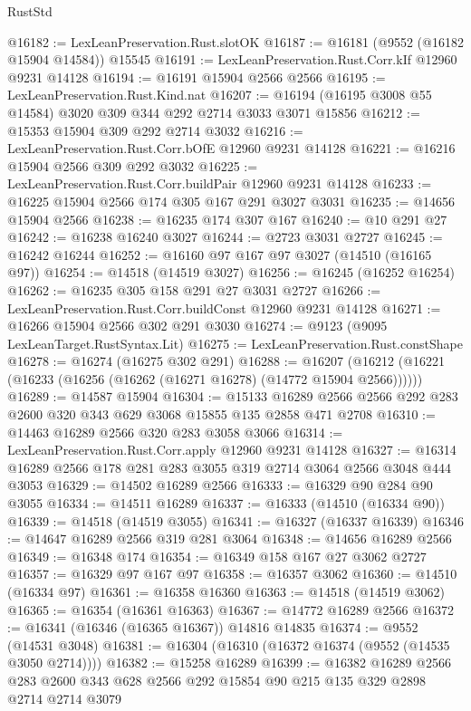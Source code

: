 \begin{lexlean}{RustStd}
\begin{coremodule}
@16182 := LexLeanPreservation.Rust.slotOK
@16187 := @16181 (@9552 (@16182 @15904 @14584)) @15545
@16191 := LexLeanPreservation.Rust.Corr.kIf @12960 @9231 @14128
@16194 := @16191 @15904 @2566 @2566
@16195 := LexLeanPreservation.Rust.Kind.nat
@16207 := @16194 (@16195 @3008 @55 @14584) @3020 @309 @344 @292 @2714 @3033 @3071 @15856
@16212 := @15353 @15904 @309 @292 @2714 @3032
@16216 := LexLeanPreservation.Rust.Corr.bOfE @12960 @9231 @14128
@16221 := @16216 @15904 @2566 @309 @292 @3032
@16225 := LexLeanPreservation.Rust.Corr.buildPair @12960 @9231 @14128
@16233 := @16225 @15904 @2566 @174 @305 @167 @291 @3027 @3031
@16235 := @14656 @15904 @2566
@16238 := @16235 @174 @307 @167
@16240 := @10 @291 @27
@16242 := @16238 @16240 @3027
@16244 := @2723 @3031 @2727
@16245 := @16242 @16244
@16252 := @16160 @97 @167 @97 @3027 (@14510 (@16165 @97))
@16254 := @14518 (@14519 @3027)
@16256 := @16245 (@16252 @16254)
@16262 := @16235 @305 @158 @291 @27 @3031 @2727
@16266 := LexLeanPreservation.Rust.Corr.buildConst @12960 @9231 @14128
@16271 := @16266 @15904 @2566 @302 @291 @3030
@16274 := @9123 (@9095 LexLeanTarget.RustSyntax.Lit)
@16275 := LexLeanPreservation.Rust.constShape
@16278 := @16274 (@16275 @302 @291)
@16288 := @16207 (@16212 (@16221 (@16233 (@16256 (@16262 (@16271 @16278) (@14772 @15904 @2566))))))
@16289 := @14587 @15904
@16304 := @15133
    @16289
    @2566
    @2566
    @292
    @283
    @2600
    @320
    @343
    @629
    @3068
    @15855
    @135
    @2858
    @471
    @2708
@16310 := @14463 @16289 @2566 @320 @283 @3058 @3066
@16314 := LexLeanPreservation.Rust.Corr.apply @12960 @9231 @14128
@16327 := @16314 @16289 @2566 @178 @281 @283 @3055 @319 @2714 @3064 @2566 @3048 @444 @3053
@16329 := @14502 @16289 @2566
@16333 := @16329 @90 @284 @90 @3055
@16334 := @14511 @16289
@16337 := @16333 (@14510 (@16334 @90))
@16339 := @14518 (@14519 @3055)
@16341 := @16327 (@16337 @16339)
@16346 := @14647 @16289 @2566 @319 @281 @3064
@16348 := @14656 @16289 @2566
@16349 := @16348 @174
@16354 := @16349 @158 @167 @27 @3062 @2727
@16357 := @16329 @97 @167 @97
@16358 := @16357 @3062
@16360 := @14510 (@16334 @97)
@16361 := @16358 @16360
@16363 := @14518 (@14519 @3062)
@16365 := @16354 (@16361 @16363)
@16367 := @14772 @16289 @2566
@16372 := @16341 (@16346 (@16365 @16367)) @14816 @14835
@16374 := @9552 (@14531 @3048)
@16381 := @16304 (@16310 (@16372 @16374 (@9552 (@14535 @3050 @2714))))
@16382 := @15258 @16289
@16399 := @16382
    @16289
    @2566
    @283
    @2600
    @343
    @628
    @2566
    @292
    @15854
    @90
    @215
    @135
    @329
    @2898
    @2714
    @2714
    @3079

\end{coremodule}
\end{lexlean}
